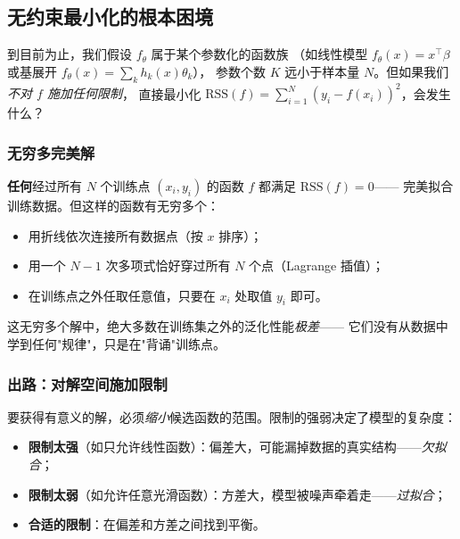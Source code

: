 \subsection{无约束最小化的根本困境}

到目前为止，我们假设 $f_\theta$ 属于某个参数化的函数族
（如线性模型 $f_\theta(x) = x^\top\beta$ 或基展开 $f_\theta(x) = \sum_k h_k(x)\theta_k$），
参数个数 $K$ 远小于样本量 $N$。但如果我们\emph{不对 $f$ 施加任何限制}，
直接最小化 $\mathrm{RSS}(f) = \sum_{i=1}^N (y_i - f(x_i))^2$，会发生什么？

\subsubsection{无穷多完美解}

\textbf{任何}经过所有 $N$ 个训练点 $(x_i, y_i)$ 的函数 $f$ 都满足 $\mathrm{RSS}(f) = 0$——
完美拟合训练数据。但这样的函数有无穷多个：

\begin{itemize}
    \item 用折线依次连接所有数据点（按 $x$ 排序）；
    \item 用一个 $N-1$ 次多项式恰好穿过所有 $N$ 个点（Lagrange 插值）；
    \item 在训练点之外任取任意值，只要在 $x_i$ 处取值 $y_i$ 即可。
\end{itemize}

这无穷多个解中，绝大多数在训练集之外的泛化性能\emph{极差}——
它们没有从数据中学到任何"规律"，只是在"背诵"训练点。

\begin{center}
\end{center}

\subsubsection{出路：对解空间施加限制}

要获得有意义的解，必须\emph{缩小}候选函数的范围。限制的强弱决定了模型的复杂度：

\begin{itemize}
    \item \textbf{限制太强}（如只允许线性函数）：偏差大，可能漏掉数据的真实结构——\emph{欠拟合}；
    \item \textbf{限制太弱}（如允许任意光滑函数）：方差大，模型被噪声牵着走——\emph{过拟合}；
    \item \textbf{合适的限制}：在偏差和方差之间找到平衡。
\end{itemize}

